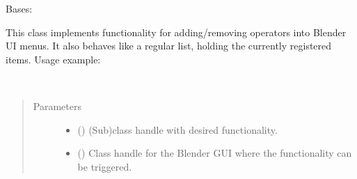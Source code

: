 \documentclass[letterpaper,10pt,english,openany,oneside]{sphinxmanual}
\begin{document}
\begin{fulllineitems}
\label{\detokenize{io_anim_mvnx:io_anim_mvnx.utils.OperatorToMenuManager}}
Bases: 

This class implements functionality for adding/removing operators
into Blender UI menus. It also behaves like a regular list, holding
the currently registered items. Usage example:

\begin{sphinxVerbatim}[commandchars=\\\{\}]
  
 
\end{sphinxVerbatim}

\begin{fulllineitems}
\label{\detokenize{io_anim_mvnx:io_anim_mvnx.utils.OperatorToMenuManager.register}}~\begin{quote}\begin{description}
\item[{Parameters}] \leavevmode\begin{itemize}
\item {} 
 () \textendash{} (Sub)class handle with desired
functionality.

\item {} 
 (\sphinxstyleliteralemphasis{\sphinxupquote{, }}\sphinxstyleliteralemphasis{\sphinxupquote{, }}) \textendash{} Class handle for the Blender GUI where the
functionality can be triggered.


\end{itemize}
\end{description}
\end{quote}
\end{fulllineitems}
\end{fulllineitems}
\end{document}
